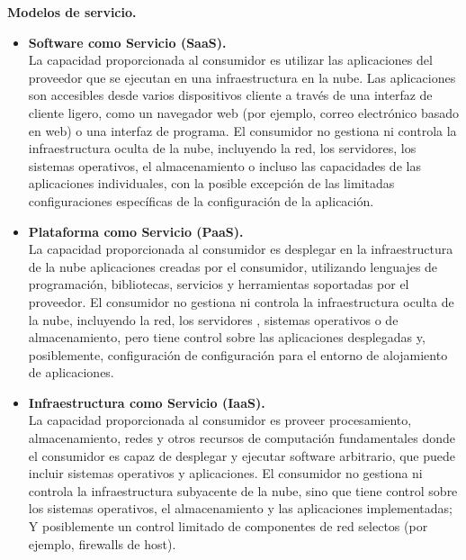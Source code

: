  \textbf{Modelos de servicio. }

\begin{itemize}
	\item \textbf {Software como Servicio (SaaS). } \\ La capacidad proporcionada al consumidor es utilizar las aplicaciones del proveedor que se ejecutan en una infraestructura en la nube. Las aplicaciones son accesibles desde varios dispositivos cliente a través de una interfaz de cliente ligero, como un navegador web (por ejemplo, correo electrónico basado en web) o una interfaz de programa. El consumidor no gestiona ni controla la infraestructura oculta de la nube, incluyendo la red, los servidores, los sistemas operativos, el almacenamiento o incluso las capacidades de las aplicaciones individuales, con la posible excepción de las limitadas configuraciones específicas de la configuración de la aplicación.
	\item \textbf {Plataforma como Servicio (PaaS). } \\ La capacidad proporcionada al consumidor es desplegar en la infraestructura de la nube aplicaciones creadas por el consumidor, utilizando lenguajes de programación, bibliotecas, servicios y herramientas soportadas por el proveedor. El consumidor no gestiona ni controla la infraestructura oculta de la nube, incluyendo la red, los servidores , sistemas operativos o de almacenamiento, pero tiene control sobre las aplicaciones desplegadas y, posiblemente, configuración de configuración para el entorno de alojamiento de aplicaciones.
	\item \textbf {Infraestructura como Servicio (IaaS). } \\  La capacidad proporcionada al consumidor es proveer procesamiento, almacenamiento, redes y otros recursos de computación fundamentales donde el consumidor es capaz de desplegar y ejecutar software arbitrario, que puede incluir sistemas operativos y aplicaciones. El consumidor no gestiona ni controla la infraestructura subyacente de la nube, sino que tiene control sobre los sistemas operativos, el almacenamiento y las aplicaciones implementadas; Y posiblemente un control limitado de componentes de red selectos (por ejemplo, firewalls de host). 
\end{itemize}  

